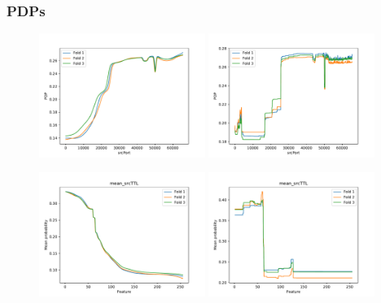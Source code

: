 \documentclass[sigconf,nonacm]{acmart}
\begin{document}
\subsubsection{PDPs}

\begin{figure}[p]
\includegraphics[width=0.48\textwidth]{plots/pdp/sourceTransportPort_nn.pdf}
\includegraphics[width=0.48\textwidth]{plots/pdp/sourceTransportPort_rf.pdf}

\includegraphics[width=0.48\textwidth]{plots/pdp/apply(mean(ipTTL),forward)_nn.pdf}
\includegraphics[width=0.48\textwidth]{plots/pdp/apply(mean(ipTTL),forward)_rf.pdf}


\end{figure}
\end{document}
